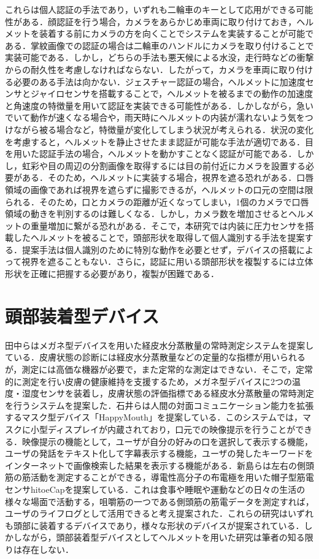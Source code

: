 これらは個人認証の手法であり，いずれも二輪車のキーとして応用ができる可能性がある．顔認証を行う場合，カメラをあらかじめ車両に取り付けておき，ヘルメットを装着する前にカメラの方を向くことでシステムを実装することが可能である．掌紋画像での認証の場合は二輪車のハンドルにカメラを取り付けることで実装可能である．しかし，どちらの手法も悪天候による水没，走行時などの衝撃からの耐久性を考慮しなければならない．したがって，カメラを車両に取り付ける必要のある手法は向かない．ジェスチャー認証の場合，ヘルメットに加速度センサとジャイロセンサを搭載することで，ヘルメットを被るまでの動作の加速度と角速度の特徴量を用いて認証を実装できる可能性がある．しかしながら，急いでいて動作が速くなる場合や，雨天時にヘルメットの内装が濡れないよう気をつけながら被る場合など，特徴量が変化してしまう状況が考えられる．状況の変化を考慮すると，ヘルメットを静止させたまま認証が可能な手法が適切である．目を用いた認証手法の場合，ヘルメットを動かすことなく認証が可能である．しかし，虹彩や目の周辺の分割画像を取得するには目の前付近にカメラを設置する必要がある．そのため，ヘルメットに実装する場合，視界を遮る恐れがある．口唇領域の画像であれば視界を遮らずに撮影できるが，ヘルメットの口元の空間は限られる．そのため，口とカメラの距離が近くなってしまい，1個のカメラで口唇領域の動きを判別するのは難しくなる．しかし，カメラ数を増加させるとヘルメットの重量増加に繋がる恐れがある．そこで，本研究では内装に圧力センサを搭載したヘルメットを被ることで，頭部形状を取得して個人識別する手法を提案する．提案手法は個人識別のために特別な動作を必要とせず，デバイスの搭載によって視界を遮ることもない．さらに，認証に用いる頭部形状を複製するには立体形状を正確に把握する必要があり，複製が困難である．

\section{頭部装着型デバイス}
田中ら\cite{glasses}はメガネ型デバイスを用いた経皮水分蒸散量の常時測定システムを提案している．皮膚状態の診断には経皮水分蒸散量などの定量的な指標が用いられるが，測定には高価な機器が必要で，また定常的な測定はできない．そこで，定常的に測定を行い皮膚の健康維持を支援するため，メガネ型デバイスに2つの温度・湿度センサを装着し，皮膚状態の評価指標である経皮水分蒸散量の常時測定を行うシステムを提案した．石井ら\cite{happymouth}は人間の対面コミュニケーション能力を拡張するマスク型デバイス「HappyMouth」を提案している．このシステムでは，マスクに小型ディスプレイが内蔵されており，口元での映像提示を行うことができる．映像提示の機能として，ユーザが自分の好みの口を選択して表示する機能，ユーザの発話をテキスト化して字幕表示する機能，ユーザの発したキーワードをインターネットで画像検索した結果を表示する機能がある．新島ら\cite{cap_sensor}は左右の側頭筋の筋活動を測定することができる，導電性高分子の布電極を用いた帽子型筋電センサhitoeCapを提案している．これは食事や睡眠や運動などの日々の生活の様々な場面で活動する，咀嚼筋の一つである側頭筋の筋電データを測定すれば，ユーザのライフログとして活用できると考え提案された．これらの研究はいずれも頭部に装着するデバイスであり，様々な形状のデバイスが提案されている．しかしながら，頭部装着型デバイスとしてヘルメットを用いた研究は筆者の知る限りは存在しない．

